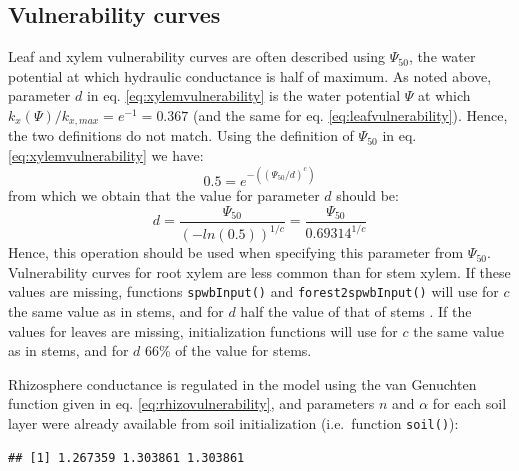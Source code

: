 \documentclass[]{book}
\newenvironment{Shaded}{\begin{snugshade}}{\end{snugshade}}
\newcommand{\KeywordTok}[1]{\textcolor[rgb]{0.13,0.29,0.53}{\textbf{#1}}}
\newcommand{\DecValTok}[1]{\textcolor[rgb]{0.00,0.00,0.81}{#1}}
\newcommand{\StringTok}[1]{\textcolor[rgb]{0.31,0.60,0.02}{#1}}
\newcommand{\OperatorTok}[1]{\textcolor[rgb]{0.81,0.36,0.00}{\textbf{#1}}}
\newcommand{\NormalTok}[1]{#1}
\begin{document}
\hypertarget{vulnerability-curves-1}{%
\subsection{Vulnerability curves}\label{vulnerability-curves-1}}

Leaf and xylem vulnerability curves are often described using \(\Psi_{50}\), the water potential at which hydraulic conductance is half of maximum. As noted above, parameter \(d\) in eq. \eqref{eq:xylemvulnerability} is the water potential \(\Psi\) at which \(k_{x}(\Psi)/k_{x,max} = e^{-1} = 0.367\) (and the same for eq. \eqref{eq:leafvulnerability}). Hence, the two definitions do not match. Using the definition of \(\Psi_{50}\) in eq. \eqref{eq:xylemvulnerability} we have:
\begin{equation}
0.5 = e^{-((\Psi_{50}/d)^c)}
\end{equation}
from which we obtain that the value for parameter \(d\) should be:
\begin{equation}
d = \frac{\Psi_{50}}{(-ln(0.5))^{1/c}}= \frac{\Psi_{50}}{0.69314^{1/c}}
\end{equation}
Hence, this operation should be used when specifying this parameter from \(\Psi_{50}\). Vulnerability curves for root xylem are less common than for stem xylem. If these values are missing, functions \texttt{spwbInput()} and \texttt{forest2spwbInput()} will use for \(c\) the same value as in stems, and for \(d\) half the value of that of stems \citep{Sperry2016}. If the values for leaves are missing, initialization functions will use for \(c\) the same value as in stems, and for \(d\) 66\% of the value for stems.

Rhizosphere conductance is regulated in the model using the van Genuchten function given in eq. \eqref{eq:rhizovulnerability}, and parameters \(n\) and \(\alpha\) for each soil layer were already available from soil initialization (i.e.~function \texttt{soil()}):

\begin{Shaded}
\end{Shaded}

\begin{verbatim}
## [1] 1.267359 1.303861 1.303861
\end{verbatim}
\end{document}
